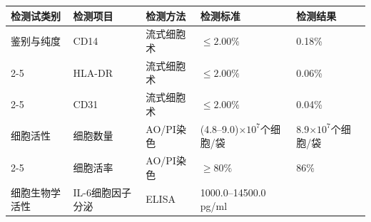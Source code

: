 \documentclass[UTF8,10pt,a4paper,fontset=fandol]{ctexart}
\newcommand{\fieldvalue}[1]{#1}
\begin{document}
\small
\begin{tabularx}{\textwidth}{|p{2.2cm}|p{3.0cm}|p{2.7cm}|X|X|}
\hline
检测试类别 & 检测项目 & 检测方法 & 检测标准 & 检测结果\\
\hline
\fieldvalue{鉴别与纯度}
&
\fieldvalue{CD14}
&
\fieldvalue{流式细胞术}
&
\fieldvalue{$\leq 2.00\%$}
&
\fieldvalue{0.18\%}
\\ \cline{2-5}
&
\fieldvalue{HLA-DR}
&
\fieldvalue{流式细胞术}
&
\fieldvalue{$\leq 2.00\%$}
&
\fieldvalue{0.06\%}
\\ \cline{2-5}
&
\fieldvalue{CD31}
&
\fieldvalue{流式细胞术}
&
\fieldvalue{$\leq 2.00\%$}
&
\fieldvalue{0.04\%}
\\ \hline
\fieldvalue{细胞活性}
&
\fieldvalue{细胞数量}
&
\fieldvalue{AO/PI染色}
&
\fieldvalue{(4.8--9.0)$\times 10^{7}$个细胞/袋}
&
\fieldvalue{8.9$\times 10^{7}$个细胞/袋}
\\ \cline{2-5}
&
\fieldvalue{细胞活率}
&
\fieldvalue{AO/PI染色}
&
\fieldvalue{$\geq 80\%$}
&
\fieldvalue{86\%}
\\ \hline
\fieldvalue{细胞生物学活性}
&
\fieldvalue{IL-6细胞因子分泌}
&
\fieldvalue{ELISA}
&
\fieldvalue{1000.0--14500.0 pg/ml}
&

\end{tabularx}
\end{document}
